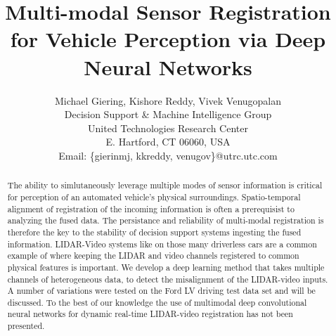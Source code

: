 \documentclass{article}
\title{Multi-modal Sensor Registration for Vehicle Perception via Deep Neural Networks}
\author{Michael Giering, Kishore Reddy, Vivek Venugopalan\\
Decision Support \& Machine Intelligence Group \\
United Technologies Research Center\\
E. Hartford, CT 06060, USA \\
Email: \{gierinmj, kkreddy, venugov\}@utrc.utc.com}
\begin{document}
\maketitle

\begin{abstract}


The ability to simlutaneously leverage multiple modes of sensor information is critical for perception of an automated vehicle's physical surroundings. Spatio-temporal alignment of registration of the incoming information is often a prerequisist to analyzing the fused data. The persistance and reliability of multi-modal registration is therefore the key to the stability of decision support systems ingesting the fused information. LIDAR-Video systems like on those many driverless cars are a common example of where keeping the LIDAR and video channels registered to common physical features is important. We develop a deep learning method that takes multiple channels of heterogeneous data, to detect the misalignment of the LIDAR-video inputs.  A number of variations were tested on the Ford LV driving test data set and will be discussed. To the best of our knowledge the use of multimodal deep convolutional neural networks for dynamic real-time LIDAR-video registration has not been presented.

\end{abstract}

\end{document}
